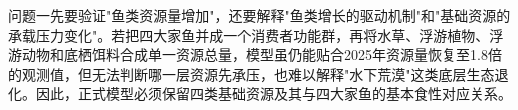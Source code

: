 问题一先要验证"鱼类资源量增加"，还要解释"鱼类增长的驱动机制"和"基础资源的承载压力变化"。若把四大家鱼并成一个消费者功能群，再将水草、浮游植物、浮游动物和底栖饵料合成单一资源总量，模型虽仍能贴合2025年资源量恢复至1.8倍的观测值，但无法判断哪一层资源先承压，也难以解释"水下荒漠"这类底层生态退化。因此，正式模型必须保留四类基础资源及其与四大家鱼的基本食性对应关系。

